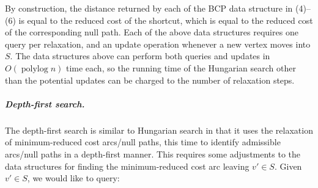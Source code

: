 \documentclass[a4paper,UKenglish]{socg-lipics-v2018}
\def\polylog{\mathop{\mathrm{polylog}}}
\theoremstyle{plain}
\numberwithin{figure}{section}
\renewcommand{\paragraph}{\subparagraph}
\begin{document}
By construction, the distance returned by
each of the BCP data structure in (4)--(6) is equal to
the reduced cost of the shortcut, which is equal to the reduced cost of the
corresponding null path.
Each of the above data structures requires one query per relaxation, and an update operation whenever a new vertex moves into $S$.
The data structures above can perform both queries and updates in $O(\polylog n)$ time each, so the
running time of the Hungarian search other than the potential updates can be
charged to the number of relaxation steps.


\paragraph{Depth-first search.}

The depth-first search is similar to Hungarian search in that it
uses the relaxation of minimum-reduced cost arcs/null paths, this time to
identify admissible arcs/null paths in a depth-first manner.
This requires some adjustments to the data structures for finding the
minimum-reduced cost arc leaving $v' \in S$.
Given $v' \in S$, we would like to query:
%
\end{document}
